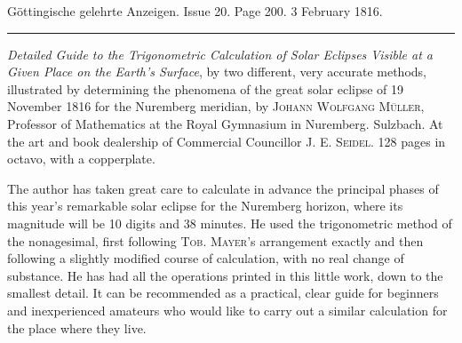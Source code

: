 \clearpage
{}
\hypertarget{native-596-lower}{}
\begin{center}\small Göttingische gelehrte Anzeigen. Issue 20. Page 200. 3 February 1816.\\[3pt]\rule{.72\linewidth}{.3pt}\end{center}

\emph{Detailed Guide to the Trigonometric Calculation of Solar Eclipses Visible at a Given Place on the Earth’s Surface}, by two different, very accurate methods, illustrated by determining the phenomena of the great solar eclipse of 19 November 1816 for the Nuremberg meridian, by \textsc{Johann Wolfgang Müller}, Professor of Mathematics at the Royal Gymnasium in Nuremberg. Sulzbach. At the art and book dealership of Commercial Councillor J. E. \textsc{Seidel}. 128 pages in octavo, with a copperplate.

The author has taken great care to calculate in advance the principal phases of this year’s remarkable solar eclipse for the Nuremberg horizon, where its magnitude will be 10 digits and 38 minutes. He used the trigonometric method of the nonagesimal, first following \textsc{Tob. Mayer}’s arrangement exactly and then following a slightly modified course of calculation, with no real change of substance. He has had all the operations printed in this little work, down to the smallest detail. It can be recommended as a practical, clear guide for beginners and inexperienced amateurs who would like to carry out a similar calculation for the place where they live.
